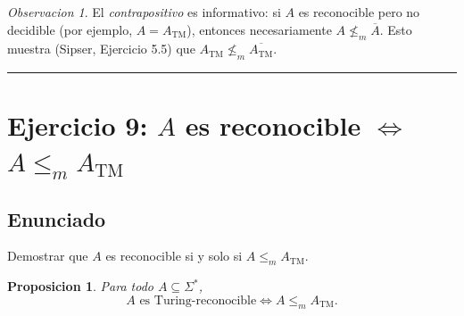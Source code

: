 \documentclass[11pt,a4paper]{article}
\theoremstyle{plain}
\newtheorem{proposicion}[teorema]{Proposicion}
\theoremstyle{definition}
\theoremstyle{remark}
\newtheorem*{observacion}{Observacion}
\newcommand{\TM}{\mathrm{TM}}
\newcommand{\Sstar}{\Sigma^{*}}
\newcommand{\redm}{\le_{m}}
\newcommand{\compl}[1]{\overline{#1}}
\newcommand{\ATM}{A_{\TM}}
\begin{document}
\begin{observacion}
El \emph{contrapositivo} es informativo: si $A$ es reconocible pero no
decidible (por ejemplo, $A=\ATM$), entonces necesariamente
$A \not\redm \compl{A}$. Esto muestra (Sipser, Ejercicio 5.5) que
$\ATM \not\redm \compl{\ATM}$.
\end{observacion}

\bigskip\hrule\bigskip

\section{Ejercicio 9: $A$ es reconocible $\iff$ $A\redm \ATM$}
\label{sec:ej9}

\subsection*{Enunciado}

Demostrar que $A$ es reconocible si y solo si $A\redm \ATM$.

\begin{proposicion}
\label{prop:ej9}
Para todo $A\subseteq\Sstar$,
\[
  A \text{ es Turing-reconocible} \iff A\redm \ATM.
\]
\end{proposicion}
\end{document}

